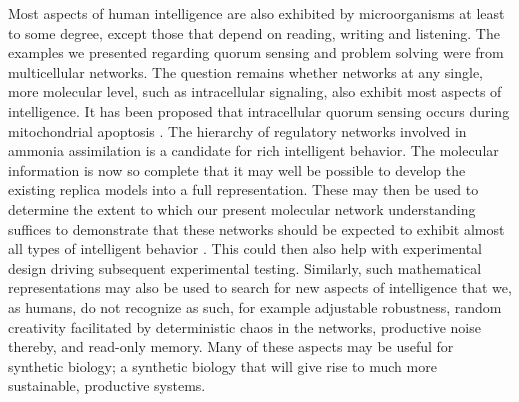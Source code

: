 Most aspects of human intelligence are also exhibited by microorganisms at least to some degree, except those that depend on reading, writing and listening. The examples we presented regarding quorum sensing and problem solving were from multicellular networks. The question remains whether networks at any single, more molecular level, such as intracellular signaling, also exhibit most aspects of intelligence. It has been proposed that intracellular quorum sensing occurs during mitochondrial apoptosis \cite{brady_wave_2006}. The hierarchy of regulatory networks involved in ammonia assimilation is a candidate for rich intelligent behavior. The molecular information is now so complete \cite{van_heeswijk_nitrogen_2013} that it may well be possible to develop the existing replica models \cite{bruggeman_multifarious_2005} into a full representation. These may then be used to determine the extent to which our present molecular network understanding suffices to demonstrate that these networks should be expected to exhibit almost all types of intelligent behavior \cite{hellingwerf_signal_1995,bruggeman_macromolecular_2000}. This could then also help with experimental design driving subsequent experimental testing. Similarly, such mathematical representations may also be used to search for new aspects of intelligence that we, as humans, do not recognize as such, for example adjustable robustness, random creativity facilitated by deterministic chaos in the networks, productive noise thereby, and read-only memory. Many of these aspects may be useful for synthetic biology; a synthetic biology that will give rise to much more sustainable, productive systems.